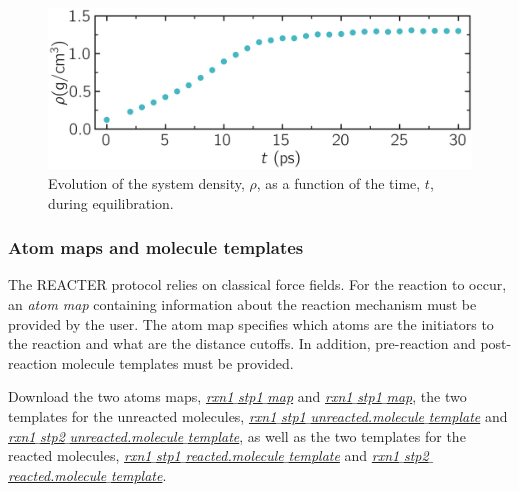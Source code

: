 \documentclass[9pt,tutorial]{livecoms}
\newcommand{\filepath}{https://raw.githubusercontent.com/lammpstutorials/lammpstutorials-article/main/files/}
\begin{document}
\begin{figure}
\centering
\includegraphics[width=\linewidth]{REACT-mixing}
\caption{Evolution of the system density, $\rho$, as a function of the
time, $t$, during equilibration.}
\label{fig:evolution-density}
\end{figure}

\subsubsection{Atom maps and molecule templates}

The REACTER protocol relies on classical force fields. For the reaction to
occur, an \textit{atom map} containing information about the reaction mechanism
must be provided by the user. The atom map specifies which atoms are
the initiators to the reaction and what are the distance cutoffs. In addition,
pre-reaction and post-reaction molecule templates must be provided.

Download the two atoms maps, \href{\filepath tutorial8/rxn1_stp1_map}{\textit{rxn1$\_$stp1$\_$map}}
and \href{\filepath tutorial8/rxn1_stp1_map}{\textit{rxn1$\_$stp1$\_$map}},
the two templates for the unreacted molecules,
\href{\filepath tutorial8/rxn1_stp1_unreacted.molecule_template}{\textit{rxn1$\_$stp1$\_$unreacted.molecule$\_$template}}
and 
\href{\filepath tutorial8/rxn1_stp2_unreacted.molecule_template}{\textit{rxn1$\_$stp2$\_$unreacted.molecule$\_$template}},
as well as the two templates for the reacted molecules,
\href{\filepath tutorial8/rxn1_stp1_reacted.molecule_template}{\textit{rxn1$\_$stp1$\_$reacted.molecule$\_$template}}
and 
\href{\filepath tutorial8/rxn1_stp2_reacted.molecule_template}{\textit{rxn1$\_$stp2$\_$reacted.molecule$\_$template}}.

\end{document}
